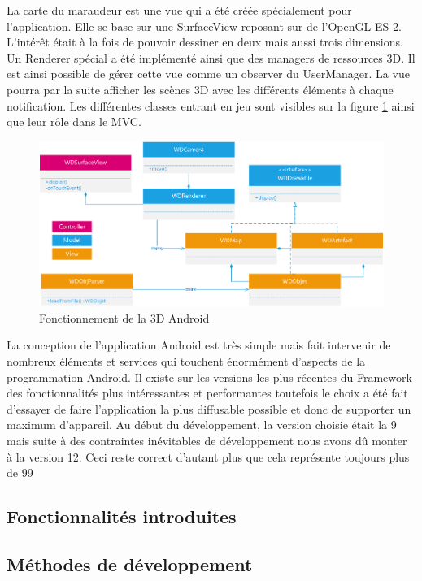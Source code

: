 La carte du maraudeur est une vue qui a été créée spécialement pour l’application. Elle se base sur une SurfaceView reposant sur de l’OpenGL ES 2. L’intérêt était à la fois de pouvoir dessiner en deux mais aussi trois dimensions. Un Renderer spécial a été implémenté ainsi que des managers de ressources 3D. Il est ainsi possible de gérer cette vue comme un observer du UserManager. La vue pourra par la suite afficher les scènes 3D avec les différents éléments à chaque notification. Les différentes classes entrant en jeu sont visibles sur la figure \ref{3d} ainsi que leur rôle dans le MVC.

\begin{figure}
    \centering
    \includegraphics{./img/android-3d.png}
    \caption{Fonctionnement de la 3D Android}
    \label{3d}
\end{figure}

La conception de l’application Android est très simple mais fait intervenir de nombreux éléments et services qui touchent énormément d’aspects de la programmation Android. Il existe sur les versions les plus récentes du Framework des fonctionnalités plus intéressantes et performantes toutefois le choix a été fait d’essayer de faire l’application la plus diffusable possible et donc de supporter un maximum d’appareil. Au début du développement, la version choisie était la 9 mais suite à des contraintes inévitables de développement nous avons dû monter à la version 12. Ceci reste correct d’autant plus que cela représente toujours plus de 99%

\subsection{Fonctionnalités introduites}


\subsection{Méthodes de développement}

